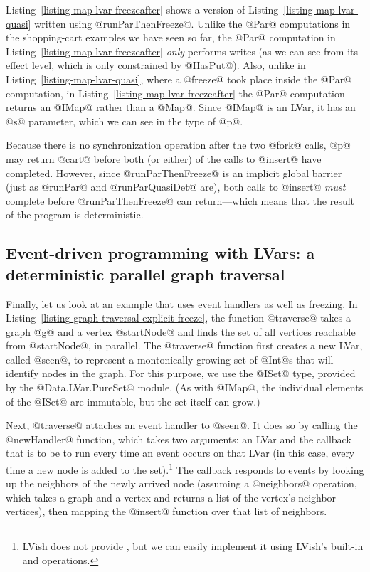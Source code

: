Listing~\ref{listing-map-lvar-freezeafter} shows a version of
Listing~\ref{listing-map-lvar-quasi} written using @runParThenFreeze@.
Unlike the @Par@ computations in the shopping-cart examples we have
seen so far, the @Par@ computation in
Listing~\ref{listing-map-lvar-freezeafter} \emph{only} performs writes
(as we can see from its effect level, which is only constrained by
@HasPut@).  Also, unlike in Listing~\ref{listing-map-lvar-quasi},
where a @freeze@ took place inside the @Par@ computation, in
Listing~\ref{listing-map-lvar-freezeafter} the @Par@ computation
returns an @IMap@ rather than a @Map@.  Since @IMap@ is an LVar, it
has an @s@ parameter, which we can see in the type of @p@.

Because there is no synchronization operation after the two @fork@
calls, @p@ may return @cart@ before both (or either) of the calls to
@insert@ have completed.  However, since @runParThenFreeze@ is an
implicit global barrier (just as @runPar@ and @runParQuasiDet@ are),
both calls to @insert@ \emph{must} complete before @runParThenFreeze@
can return---which means that the result of the program is
deterministic.

\subsection{Event-driven programming with LVars: a deterministic parallel graph traversal}\label{subsection:lvish-parallel-graph-traversal}

Finally, let us look at an example that uses event handlers as well as
freezing.  In Listing~\ref{listing-graph-traversal-explicit-freeze},
the function @traverse@ takes a graph @g@ and a vertex @startNode@ and
finds the set of all vertices reachable from @startNode@, in parallel.
The @traverse@ function first creates a new LVar, called @seen@, to
represent a montonically growing set of @Int@s that will identify
nodes in the graph.  For this purpose, we use the @ISet@ type,
provided by the @Data.LVar.PureSet@ module.  (As with @IMap@, the
individual elements of the @ISet@ are immutable, but the set itself
can grow.)

\singlespacing

\doublespacing

Next, @traverse@ attaches an event handler to @seen@.  It does so by
calling the @newHandler@ function, which takes two arguments: an LVar
and the callback that is to be to run every time an event occurs on
that LVar (in this case, every time a new node is added to the
set).\footnote{LVish does not provide , but we can
  easily implement it using LVish's built-in  and
   operations.}  The callback responds to events by
looking up the neighbors of the newly arrived node (assuming a
@neighbors@ operation, which takes a graph and a vertex and returns a
list of the vertex's neighbor vertices), then mapping the @insert@
function over that list of neighbors.

